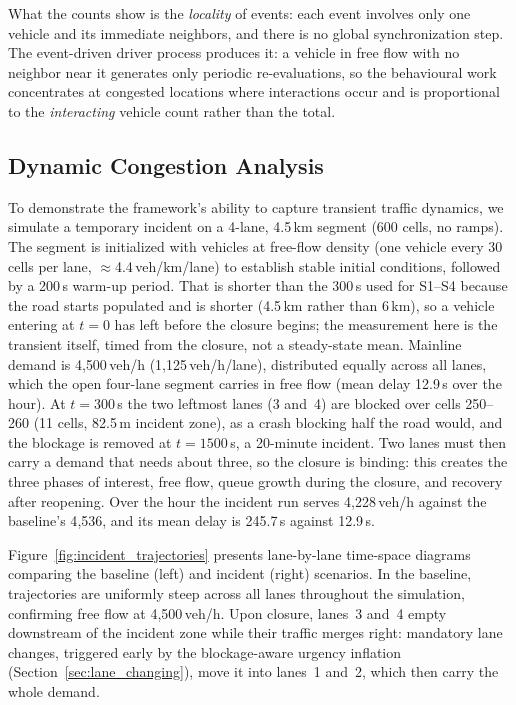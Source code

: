 \documentclass[review,number]{elsarticle}
\begin{document}
What the counts show is the \emph{locality} of events: each event involves only one vehicle and its immediate neighbors, and there is no global synchronization step. The event-driven driver process produces it: a vehicle in free flow with no neighbor near it generates only periodic re-evaluations, so the behavioural work concentrates at congested locations where interactions occur and is proportional to the \emph{interacting} vehicle count rather than the total.


\subsection{Dynamic Congestion Analysis}
\label{sec:exp_incident}

To demonstrate the framework's ability to capture transient traffic dynamics, we simulate a temporary incident on a 4-lane, 4.5\,km segment (600 cells, no ramps). The segment is initialized with vehicles at free-flow density (one vehicle every 30 cells per lane, $\approx$4.4\,veh/km/lane) to establish stable initial conditions, followed by a 200\,s warm-up period. That is shorter than the 300\,s used for S1--S4 because the road starts populated and is shorter (4.5\,km rather than 6\,km), so a vehicle entering at $t = 0$ has left before the closure begins; the measurement here is the transient itself, timed from the closure, not a steady-state mean. Mainline demand is 4{,}500\,veh/h (1{,}125\,veh/h/lane), distributed equally across all lanes, which the open four-lane segment carries in free flow (mean delay 12.9\,s over the hour). At $t = 300$\,s the two leftmost lanes (3 and~4) are blocked over cells 250--260 (11 cells, 82.5\,m incident zone), as a crash blocking half the road would, and the blockage is removed at $t = 1500$\,s, a 20-minute incident. Two lanes must then carry a demand that needs about three, so the closure is binding: this creates the three phases of interest, free flow, queue growth during the closure, and recovery after reopening. Over the hour the incident run serves 4{,}228\,veh/h against the baseline's 4{,}536, and its mean delay is 245.7\,s against 12.9\,s.

Figure~\ref{fig:incident_trajectories} presents lane-by-lane time-space diagrams comparing the baseline (left) and incident (right) scenarios. In the baseline, trajectories are uniformly steep across all lanes throughout the simulation, confirming free flow at 4{,}500\,veh/h. Upon closure, lanes~3 and~4 empty downstream of the incident zone while their traffic merges right: mandatory lane changes, triggered early by the blockage-aware urgency inflation (Section~\ref{sec:lane_changing}), move it into lanes~1 and~2, which then carry the whole demand.
\end{document}
